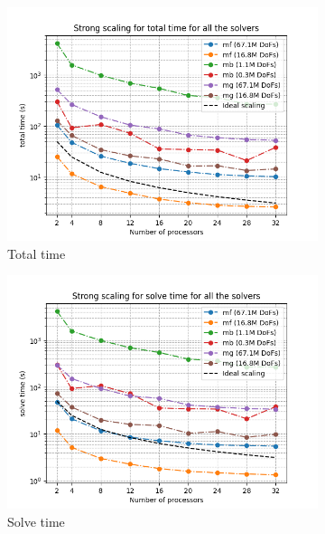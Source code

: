 \begin{figure}[h!]
     \centering
     \begin{subfigure}[h]{0.7\textwidth}
         \centering
         \includegraphics[width=\textwidth]{figure/strongcomp_total.png}
         \caption{Total time}
     \end{subfigure}
     \begin{subfigure}[h]{0.5\textwidth}
         \centering
         \includegraphics[width=\textwidth]{figure/strongcomp_solve.png}
         \caption{Solve time}
     \end{subfigure}
     \hspace*{-0.4cm}
     \begin{subfigure}[h]{0.5\textwidth}

\end{subfigure}
\end{figure}
